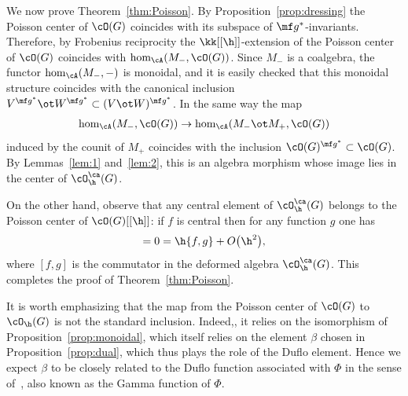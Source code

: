 We now prove Theorem~\ref{thm:Poisson}. By Proposition~\ref{prop:dressing} the Poisson center of $\cO(G)$ coincides with its subspace of $\mf g^*$-invariants. Therefore, by Frobenius reciprocity the $\kk[[\h]]$-extension of the Poisson center of $\cO(G)$ coincides with $\hom_\cA(M_-,\cO(G))$. Since $M_-$ is a coalgebra, the functor $\hom_\cA(M_-,-)$ is monoidal, and it is easily checked that this monoidal structure coincides with the canonical inclusion $V^{\mf g^*}\ot W^{\mf g^*}\subset (V\ot W)^{\mf g^*}$. In the same way the map
\begin{gather*}
	\hom_\cA(M_-,\cO(G))\rightarrow \hom_\cA(M_- \ot M_+,\cO(G))
\end{gather*}
induced by the counit of $M_+$ coincides with the inclusion $\cO(G)^{\mf g^*} \subset \cO(G)$. By Lemmas~\ref{lem:1} and~\ref{lem:2}, this is an algebra morphism whose image lies in the center of $\cO_\h^\ca(G)$.

	On the other hand, observe that any central element of $\cO_\h^\ca(G)$ belongs to the Poisson center of $\cO(G)[[\h]]$: if $f$ is central then for any function $g$ one has
	\begin{gather*}
		[f,g]=0=\h\{f,g\}+O\big(\h^2\big),
	\end{gather*}
	where $[f,g]$ is the commutator in the deformed algebra $\cO_\h^\ca(G)$. This completes the proof of Theorem~\ref{thm:Poisson}.

	\begin{rmk}\label{rmk:gamma}
		It is worth emphasizing that the map from the Poisson center of $\cO(G)$ to $\cO_\h(G)$ is not the standard inclusion. Indeed,, it relies on the isomorphism of Proposition~\ref{prop:monoidal}, which itself relies on the element $\beta$ chosen in Proposition~\ref{prop:dual}, which thus plays the role of the Duf\/lo element. Hence we expect $\beta$ to be closely related to the Duf\/lo function associated with $\Phi$ in the sense of~\cite{Alekseev2010}, also known as the Gamma function of $\Phi$.
	\end{rmk}
